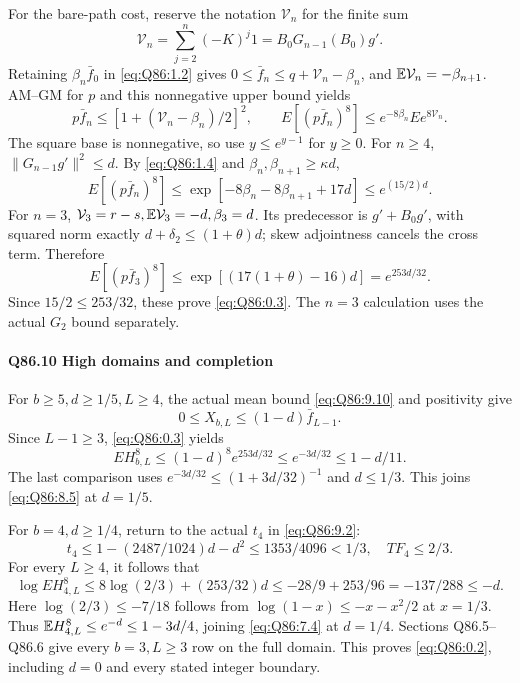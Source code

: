 For the bare-path cost, reserve the notation \(\mathcal V_n\) for the finite sum
\[
\mathcal V_n=\sum_{j=2}^n(-K)^j1
=B_0G_{n-1}(B_0)g'.
\]
Retaining \(\beta_n\bar f_0\) in \eqref{eq:Q86:1.2} gives
\(0\le\allowbreak \bar f_n\le\allowbreak  q+\mathcal V_n-\beta_n\), and
\(\mathbb E\mathcal V_n=\allowbreak -\beta_{n+1}\).
AM--GM for \(p\) and this nonnegative upper bound yields
\[
p \bar f_n\le[1+(\mathcal V_n-\beta_n)/2]^2,
\qquad E[(p \bar f_n)^8]\le e^{-8\beta_n}Ee^{8\mathcal V_n}.
\tag{Q86.9.11}\label{eq:Q86:9.11}
\]
The square base is nonnegative, so use \(y\le\allowbreak  e^{y-1}\) for \(y\ge\allowbreak 0\).
For \(n\ge\allowbreak 4\), \(\|G_{n-1}g'\|^2\le\allowbreak  d\).
By \eqref{eq:Q86:1.4} and
\(\beta_n,\allowbreak \beta_{n+1}\ge\allowbreak \kappa d\),
\[
E[(p \bar f_n)^8]\le\exp[-8\beta_n-8\beta_{n+1}+17d]
\le e^{(15/2)d}.
\tag{Q86.9.12}\label{eq:Q86:9.12}
\]
For \(n=\allowbreak 3\),
\(\mathcal V_3=\allowbreak r-s,\allowbreak \mathbb E\mathcal V_3=\allowbreak -d,\allowbreak \beta_3=\allowbreak d\).
Its predecessor is \(g'+B_0g'\), with squared norm exactly
\(d+\delta_2\le\allowbreak (1+\theta)d\); skew adjointness cancels the cross term.
Therefore
\[
E[(p \bar f_3)^8]\le\exp[(17(1+\theta)-16)d]=e^{253d/32}.
\tag{Q86.9.13}\label{eq:Q86:9.13}
\]
Since \(15/2\le\allowbreak 253/32\), these prove \eqref{eq:Q86:0.3}.
The \(n=\allowbreak 3\) calculation uses the actual \(G_2\) bound separately.

\paragraph{Q86.10 High domains and completion}
For \(b\ge\allowbreak 5,\allowbreak d\ge\allowbreak 1/5,\allowbreak L\ge\allowbreak 4\), the actual mean bound
\eqref{eq:Q86:9.10} and positivity give
\[
0\le X_{b,L}\le(1-d)\bar f_{L-1}.
\]
Since \(L-1\ge\allowbreak 3\), \eqref{eq:Q86:0.3} yields
\[
E H_{b,L}^8\le(1-d)^8e^{253d/32}
\le e^{-3d/32}\le1-d/11.
\tag{Q86.10.1}\label{eq:Q86:10.1}
\]
The last comparison uses
\(e^{-3d/32}\le\allowbreak (1+3d/32)^{-1}\) and \(d\le\allowbreak 1/3\).
This joins \eqref{eq:Q86:8.5} at \(d=\allowbreak 1/5\).

For \(b=\allowbreak 4,\allowbreak d\ge\allowbreak 1/4\), return to the actual \(t_4\) in
\eqref{eq:Q86:9.2}:
\[
t_4\le1-(2487/1024)d-d^2\le1353/4096<1/3,
\quad TF_4\le2/3.
\]
For every \(L\ge\allowbreak 4\), it follows that
\[
\log E H_{4,L}^8\le8\log(2/3)+(253/32)d
\le-28/9+253/96=-137/288\le-d.
\tag{Q86.10.2}\label{eq:Q86:10.2}
\]
Here \(\log(2/3)\le\allowbreak -7/18\) follows from
\(\log(1-x)\le\allowbreak -x-x^2/2\) at \(x=\allowbreak 1/3\).
Thus \(\mathbb E H_{4,\allowbreak L}^8\le\allowbreak  e^{-d}\le\allowbreak 1-3d/4\), joining
\eqref{eq:Q86:7.4} at \(d=\allowbreak 1/4\).
Sections Q86.5--Q86.6 give every \(b=\allowbreak 3,\allowbreak L\ge\allowbreak 3\) row on the full domain.
This proves \eqref{eq:Q86:0.2}, including \(d=\allowbreak 0\) and every stated integer boundary.

